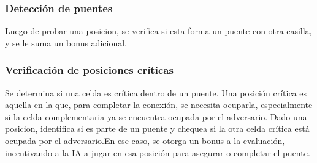 \documentclass[a4paper,12pt]{article}
\begin{document}
		 \subsubsection{Detección de puentes}
		 Luego de probar una posicion, se verifica si esta forma un puente con otra casilla, y se le suma un bonus adicional.
		 \subsubsection{Verificación de posiciones críticas}
		 Se determina si una celda es crítica dentro de un puente. Una posición crítica es aquella en la que, para completar la conexión, se necesita ocuparla, especialmente si la celda complementaria ya se encuentra ocupada por el adversario.
		 \newline
		 Dado una posicion, identifica si es parte de un puente y chequea si la otra celda crítica está ocupada por el adversario.En ese caso, se otorga un bonus  a la evaluación, incentivando a la IA a jugar en esa posición para asegurar o completar el puente.
		 
		 
		 
	
\end{document}
